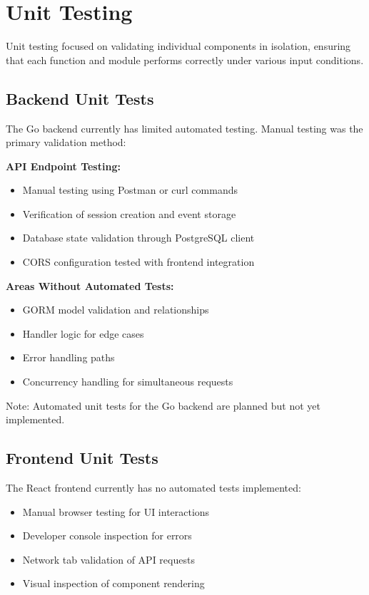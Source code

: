 \section{Unit Testing}

Unit testing focused on validating individual components in isolation, ensuring that each function and module performs correctly under various input conditions.

\subsection{Backend Unit Tests}

The Go backend currently has limited automated testing. Manual testing was the primary validation method:

\textbf{API Endpoint Testing:}
\begin{itemize}
    \item Manual testing using Postman or curl commands
    \item Verification of session creation and event storage
    \item Database state validation through PostgreSQL client
    \item CORS configuration tested with frontend integration
\end{itemize}

\textbf{Areas Without Automated Tests:}
\begin{itemize}
    \item GORM model validation and relationships
    \item Handler logic for edge cases
    \item Error handling paths
    \item Concurrency handling for simultaneous requests
\end{itemize}

Note: Automated unit tests for the Go backend are planned but not yet implemented.

\subsection{Frontend Unit Tests}

The React frontend currently has no automated tests implemented:

\begin{itemize}
    \item Manual browser testing for UI interactions
    \item Developer console inspection for errors
    \item Network tab validation of API requests
    \item Visual inspection of component rendering
\end{itemize}

